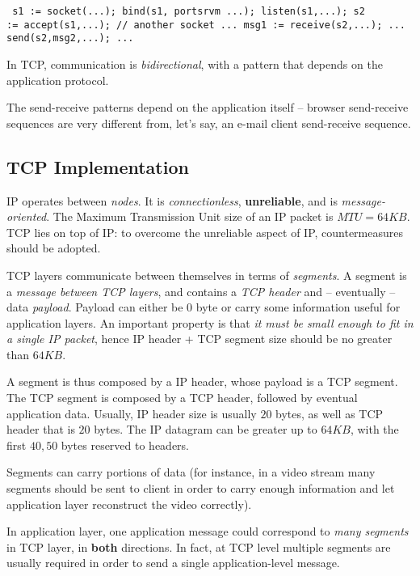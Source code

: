 \documentclass[a4paper, 12pt]{report}
\begin{document}
\begin{verbatim} s1 := socket(...); bind(s1, portsrvm ...); listen(s1,...); s2
:= accept(s1,...); // another socket ... msg1 := receive(s2,...); ...
send(s2,msg2,...); ... \end{verbatim}

In TCP, communication is \emph{bidirectional}, with a pattern that depends on
the application protocol.

The send-receive patterns depend on the application itself \--- browser
send-receive sequences are very different from, let's say, an e-mail client
send-receive sequence.

\subsection{TCP Implementation}

IP operates between \emph{nodes}. It is \emph{connectionless},
\textbf{unreliable}, and is \emph{message-oriented}. The Maximum Transmission
Unit size of an IP packet is $MTU = 64KB$. TCP lies on top of IP: to overcome
the unreliable aspect of IP, countermeasures should be adopted.

TCP layers communicate between themselves in terms of \emph{segments}. A
segment is a \emph{message between TCP layers}, and contains a \emph{TCP
header} and \--- eventually \--- data \emph{payload}. Payload can either be $0$
byte or carry some information useful for application layers. An important
property is that \emph{it must be small enough to fit in a single IP packet},
hence IP header + TCP segment size should be no greater than $64KB$.

A segment is thus composed by a IP header, whose payload is a TCP segment. The
TCP segment is composed by a TCP header, followed by eventual application data.
Usually, IP header size is usually $20$ bytes, as well as TCP header that is
$20$ bytes. The IP datagram can be greater up to $64KB$, with the first $40,50$
bytes reserved to headers.

Segments can carry portions of data (for instance, in a video stream many
segments should be sent to client in order to carry enough information and let
application layer reconstruct the video correctly).

In application layer, one application message could correspond to \emph{many
segments} in TCP layer, in \textbf{both} directions. In fact, at TCP level
multiple segments are usually required in order to send a single
application-level message.
\end{document}
